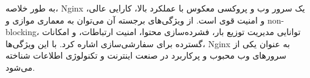 \documentclass[a4paper,10pt]{article}
\begin{document}
    \vspace{15pt}

    \begin{conclusion}

        به طور خلاصه، Nginx یک سرور وب و پروکسی معکوس با عملکرد بالا، کارایی عالی، و امنیت قوی است. از ویژگی‌های برجسته آن می‌توان به معماری موازی و non-blocking، توانایی مدیریت توزیع بار، فشرده‌سازی محتوا، امنیت ارتباطات، و امکانات گسترده برای سفارشی‌سازی اشاره کرد. با این ویژگی‌ها، Nginx به عنوان یکی از سرورهای وب محبوب و پرکاربرد در صنعت اینترنت و تکنولوژی اطلاعات شناخته می‌شود.

    \end{conclusion}
    
\end{document}
